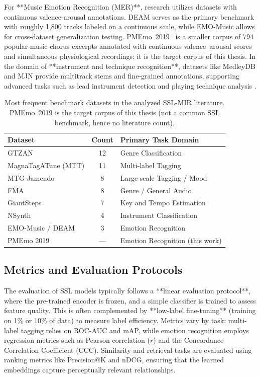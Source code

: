 \documentclass[12pt]{report}
\begin{document}
For **Music Emotion Recognition (MER)**, research utilizes datasets with continuous valence-arousal annotations. DEAM \cite{DEAM_Dataset} serves as the primary benchmark with roughly 1,800 tracks labeled on a continuous scale, while EMO-Music \cite{EMOMusic} allows for cross-dataset generalization testing. PMEmo~2019~\cite{zhang_pmemo_2018} is a smaller corpus of $794$ popular-music chorus excerpts annotated with continuous valence--arousal scores and simultaneous physiological recordings; it is the target corpus of this thesis. In the domain of **instrument and technique recognition**, datasets like MedleyDB \cite{MedleyDB} and MJN provide multitrack stems and fine-grained annotations, supporting advanced tasks such as lead instrument detection and playing technique analysis \cite{li_mertech_2024}.

\begin{table}[ht]
\centering
\caption{Most frequent benchmark datasets in the analyzed SSL-MIR literature. PMEmo~2019 is the target corpus of this thesis (not a common SSL benchmark, hence no literature count).}
\label{tab:dataset_stats}
\begin{tabularx}{0.8\textwidth}{@{} X c l @{}}
\toprule
\textbf{Dataset} & \textbf{Count} & \textbf{Primary Task Domain} \\ \midrule
GTZAN & 12 & Genre Classification \\
MagnaTagATune (MTT) & 11 & Multi-label Tagging \\
MTG-Jamendo & 8 & Large-scale Tagging / Mood \\
FMA & 8 & Genre / General Audio \\
GiantSteps & 7 & Key and Tempo Estimation \\
NSynth & 4 & Instrument Classification \\
EMO-Music / DEAM & 3 & Emotion Recognition \\
PMEmo 2019~\cite{zhang_pmemo_2018} & --- & Emotion Recognition (this work) \\
\bottomrule
\end{tabularx}
\end{table}


\subsection{Metrics and Evaluation Protocols}
The evaluation of SSL models typically follows a **linear evaluation protocol**, where the pre-trained encoder is frozen, and a simple classifier is trained to assess feature quality. This is often complemented by **low-label fine-tuning** (training on 1\% or 10\% of data) to measure label efficiency. Metrics vary by task: multi-label tagging relies on ROC-AUC and mAP, while emotion recognition employs regression metrics such as Pearson correlation ($r$) and the Concordance Correlation Coefficient (CCC). Similarity and retrieval tasks are evaluated using ranking metrics like Precision@K and nDCG, ensuring that the learned embeddings capture perceptually relevant relationships.
\end{document}

